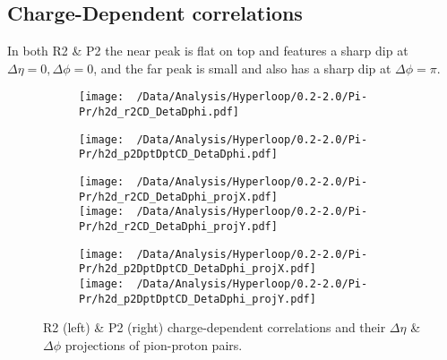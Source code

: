 \documentclass[12pt,a4paper,twoside]{report}
\begin{document}
\subsection{Charge-Dependent correlations}
In both R2 \& P2 the near peak is flat on top and features a sharp dip at $\Delta\eta=0,\Delta\phi=0$, and the far peak is small and also has a sharp dip at $\Delta\phi=\pi$.
\begin{figure}[H]
	\begin{subfigure}{0.49\linewidth}
		\texttt{[image: ~/Data/Analysis/Hyperloop/0.2-2.0/Pi-Pr/h2d\_r2CD\_DetaDphi.pdf]}\\
	\end{subfigure}
	\begin{subfigure}{0.49\linewidth}
		\texttt{[image: ~/Data/Analysis/Hyperloop/0.2-2.0/Pi-Pr/h2d\_p2DptDptCD\_DetaDphi.pdf]}\\
	\end{subfigure}
\end{figure}
\begin{figure}[H]
	\ContinuedFloat
	\begin{subfigure}{0.49\linewidth}
		\texttt{[image: ~/Data/Analysis/Hyperloop/0.2-2.0/Pi-Pr/h2d\_r2CD\_DetaDphi\_projX.pdf]}\\
		\texttt{[image: ~/Data/Analysis/Hyperloop/0.2-2.0/Pi-Pr/h2d\_r2CD\_DetaDphi\_projY.pdf]}\\
	\end{subfigure}
	\begin{subfigure}{0.49\linewidth}
		\texttt{[image: ~/Data/Analysis/Hyperloop/0.2-2.0/Pi-Pr/h2d\_p2DptDptCD\_DetaDphi\_projX.pdf]}\\
		\texttt{[image: ~/Data/Analysis/Hyperloop/0.2-2.0/Pi-Pr/h2d\_p2DptDptCD\_DetaDphi\_projY.pdf]}\\
	\end{subfigure}
	\caption{R2 (left) \& P2 (right) charge-dependent correlations and their $\Delta\eta$ \& $\Delta\phi$ projections of pion-proton pairs.}
\end{figure}
\end{document}
